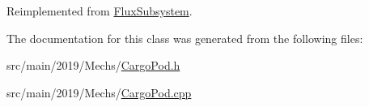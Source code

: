 Reimplemented from \hyperlink{classFluxSubsystem_a327d76affc60699bfa62563e364e42f5}{Flux\+Subsystem}.



The documentation for this class was generated from the following files\+:\begin{DoxyCompactItemize}
\item 
src/main/2019/\+Mechs/\hyperlink{CargoPod_8h}{Cargo\+Pod.\+h}\item 
src/main/2019/\+Mechs/\hyperlink{CargoPod_8cpp}{Cargo\+Pod.\+cpp}\end{DoxyCompactItemize}
